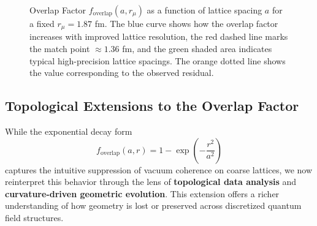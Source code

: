 ﻿\documentclass[12pt]{article}
\theoremstyle{definition}
\theoremstyle{plain}
\begin{document}
\begin{figure}[H]
\centering
{}
\caption{Overlap Factor $f_{\mathrm{overlap}}(a, r_\mu)$ as a function of lattice spacing $a$ for a fixed $r_\mu = 1.87$ fm. The blue curve shows how the overlap factor increases with improved lattice resolution, the red dashed line marks the match point $\approx 1.36$ fm, and the green shaded area indicates typical high-precision lattice spacings. The orange dotted line shows the value corresponding to the observed residual.}
\label{fig:overlap_factor}
\end{figure}



\subsection{Topological Extensions to the Overlap Factor}

While the exponential decay form  
\[
f_{\mathrm{overlap}}(a, r) = 1 - \exp\left(-\frac{r^2}{a^2}\right)
\]  
captures the intuitive suppression of vacuum coherence on coarse lattices, we now reinterpret this behavior through the lens of \textbf{topological data analysis} and \textbf{curvature-driven geometric evolution}. This extension offers a richer understanding of how geometry is lost or preserved across discretized quantum field structures.
\end{document}
